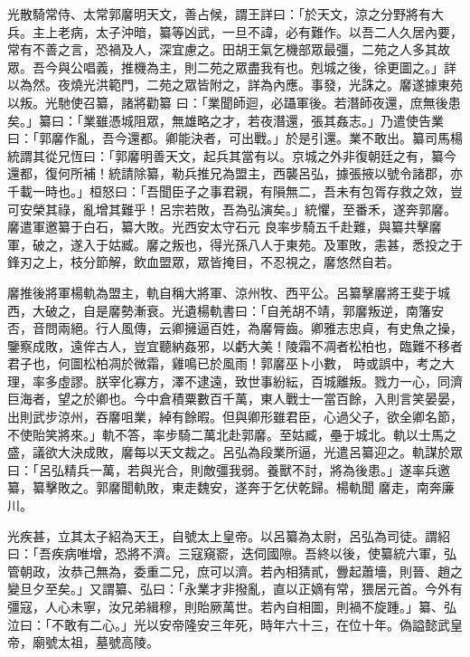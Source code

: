 \begin{pinyinscope}
 光散騎常侍、太常郭黁明天文，善占候，謂王詳曰：「於天文，涼之分野將有大兵。主上老病，太子沖暗，纂等凶武，一旦不諱，必有難作。以吾二人久居內要，常有不善之言，恐禍及人，深宜慮之。田胡王氣乞機部眾最彊，二苑之人多其故眾。吾今與公唱義，推機為主，則二苑之眾盡我有也。剋城之後，徐更圖之。」詳以為然。夜燒光洪範門，二苑之眾皆附之，詳為內應。事發，光誅之。黁遂據東苑以叛。光馳使召纂，諸將勸纂
 曰：「業聞師迴，必躡軍後。若潛師夜還，庶無後患矣。」纂曰：「業雖憑城阻眾，無雄略之才，若夜潛還，張其姦志。」乃遣使告業曰：「郭黁作亂，吾今還都。卿能決者，可出戰。」於是引還。業不敢出。纂司馬楊統謂其從兄恆曰：「郭黁明善天文，起兵其當有以。京城之外非復朝廷之有，纂今還都，復何所補！統請除纂，勒兵推兄為盟主，西襲呂弘，據張掖以號令諸郡，亦千載一時也。」桓怒曰：「吾聞臣子之事君親，有隕無二，吾未有包胥存救之效，豈可安榮其祿，亂增其難乎！呂宗若敗，吾為弘演矣。」統懼，至番禾，遂奔郭黁。黁遣軍邀纂于白石，纂大敗。光西安太守石元
 良率步騎五千赴難，與纂共擊黁軍，破之，遂入于姑臧。黁之叛也，得光孫八人于東苑。及軍敗，恚甚，悉投之于鋒刃之上，枝分節解，飲血盟眾，眾皆掩目，不忍視之，黁悠然自若。



 黁推後將軍楊軌為盟主，軌自稱大將軍、涼州牧、西平公。呂纂擊黁將王斐于城西，大破之，自是黁勢漸衰。光遺楊軌書曰：「自羌胡不靖，郭黁叛逆，南籓安否，音問兩絕。行人風傳，云卿擁逼百姓，為黁脣齒。卿雅志忠貞，有史魚之操，鑒察成敗，遠侔古人，豈宜聽納姦邪，以虧大美！陵霜不凋者松柏也，臨難不移者君子也，何圖松柏凋於微霜，雞鳴已於風雨！郭黁巫卜小數，
 時或誤中，考之大理，率多虛謬。朕宰化寡方，澤不逮遠，致世事紛紜，百城離叛。戮力一心，同濟巨海者，望之於卿也。今中倉積粟數百千萬，東人戰士一當百餘，入則言笑晏晏，出則武步涼州，吞黁咀業，綽有餘暇。但與卿形雖君臣，心過父子，欲全卿名節，不使貽笑將來。」軌不答，率步騎二萬北赴郭黁。至姑臧，壘于城北。軌以士馬之盛，議欲大決成敗，黁每以天文裁之。呂弘為段業所逼，光遣呂纂迎之。軌謀於眾曰：「呂弘精兵一萬，若與光合，則敵彊我弱。養獸不討，將為後患。」遂率兵邀纂，纂擊敗之。郭黁聞軌敗，東走魏安，遂奔于乞伏乾歸。楊軌聞
 黁走，南奔廉川。



 光疾甚，立其太子紹為天王，自號太上皇帝。以呂纂為太尉，呂弘為司徒。謂紹曰：「吾疾病唯增，恐將不濟。三寇窺窬，迭伺國隙。吾終以後，使纂統六軍，弘管朝政，汝恭己無為，委重二兄，庶可以濟。若內相猜貳，釁起蕭墻，則晉、趙之變旦夕至矣。」又謂纂、弘曰：「永業才非撥亂，直以正嫡有常，猥居元首。今外有彊寇，人心未寧，汝兄弟緝穆，則貽厥萬世。若內自相圖，則禍不旋踵。」纂、弘泣曰：「不敢有二心。」光以安帝隆安三年死，時年六十三，在位十年。偽謚懿武皇帝，廟號太祖，墓號高陵。




\end{pinyinscope}
